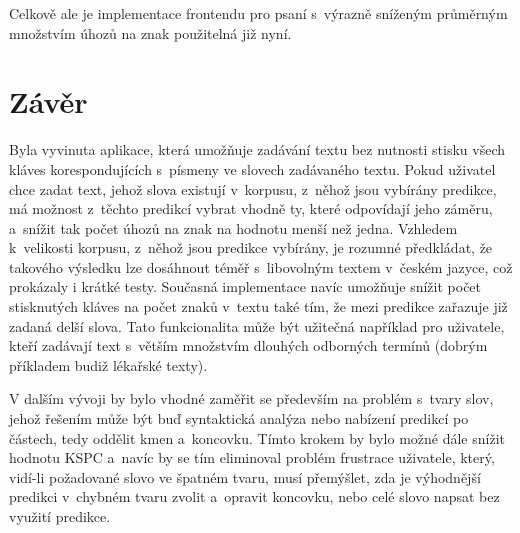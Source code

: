 \documentclass[a4paper,11pt,openany]{book} %
\begin{document}
Celkově ale je implementace frontendu pro psaní s~výrazně sníženým průměrným množstvím úhozů na znak použitelná již nyní.

\clearpage

\chapter*{Závěr}


Byla vyvinuta aplikace, která umožňuje zadávání textu bez nutnosti stisku všech kláves korespondujících s~písmeny ve slovech zadávaného textu. Pokud uživatel chce zadat text, jehož slova existují v~korpusu, z~něhož jsou vybírány predikce, má možnost z~těchto predikcí vybrat vhodně ty, které odpovídají jeho záměru, a~snížit tak počet úhozů na znak na hodnotu menší než jedna. Vzhledem k~velikosti korpusu, z~něhož jsou predikce vybírány, je rozumné předkládat, že takového výsledku lze dosáhnout téměř s~libovolným textem v~českém jazyce, což prokázaly i krátké testy. Současná implementace navíc umožňuje snížit počet stisknutých kláves na počet znaků v~textu také tím, že mezi predikce zařazuje již zadaná delší slova. Tato funkcionalita může být užitečná například pro uživatele, kteří zadávají text s~větším množstvím dlouhých odborných termínů (dobrým příkladem budiž lékařské texty).

V dalším vývoji by bylo vhodné zaměřit se především na problém s~tvary slov, jehož řešením může být buď syntaktická analýza nebo nabízení predikcí po částech, tedy oddělit kmen a~koncovku. Tímto krokem by bylo možné dále snížit hodnotu KSPC a~navíc by se tím eliminoval problém frustrace uživatele, který, vidí-li požadované slovo ve špatném tvaru, musí přemýšlet, zda je výhodnější predikci v~chybném tvaru zvolit a~opravit koncovku, nebo celé slovo napsat bez využití predikce. 

\clearpage

\pagestyle{plain}

\printbibliography[title={Seznam literatury}]

\end{document}
